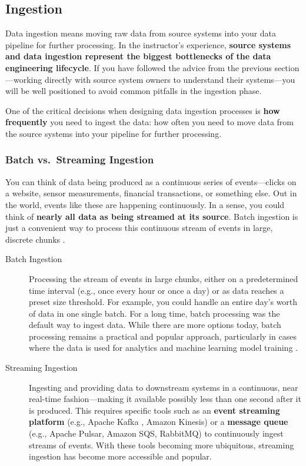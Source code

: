 \documentclass{article}
\begin{document}
\subsection{Ingestion}
Data ingestion means moving raw data from source systems into your data pipeline for further processing. In the instructor's experience, \textbf{source systems and data ingestion represent the biggest bottlenecks of the data engineering lifecycle}. If you have followed the advice from the previous section---working directly with source system owners to understand their systems---you will be well positioned to avoid common pitfalls in the ingestion phase.

One of the critical decisions when designing data ingestion processes is \textbf{how frequently} you need to ingest the data: how often you need to move data from the source systems into your pipeline for further processing.

\subsubsection{Batch vs.\ Streaming Ingestion}
You can think of data being produced as a continuous series of events---clicks on a website, sensor measurements, financial transactions, or something else. Out in the world, events like these are happening continuously. In a sense, you could think of \textbf{nearly all data as being streamed at its source}. Batch ingestion is just a convenient way to process this continuous stream of events in large, discrete chunks \cite{kleppmann2017designing}.

\begin{description}
    \item[Batch Ingestion] Processing the stream of events in large chunks, either on a predetermined time interval (e.g., once every hour or once a day) or as data reaches a preset size threshold. For example, you could handle an entire day's worth of data in one single batch. For a long time, batch processing was the default way to ingest data. While there are more options today, batch processing remains a practical and popular approach, particularly in cases where the data is used for analytics and machine learning model training \cite{reis2022fundamentals}.

    \item[Streaming Ingestion] Ingesting and providing data to downstream systems in a continuous, near real-time fashion---making it available possibly less than one second after it is produced. This requires specific tools such as an \textbf{event streaming platform} (e.g., Apache Kafka \cite{narkhede2017kafka}, Amazon Kinesis) or a \textbf{message queue} (e.g., Apache Pulsar, Amazon SQS, RabbitMQ) to continuously ingest streams of events. With these tools becoming more ubiquitous, streaming ingestion has become more accessible and popular.
\end{description}
\end{document}
